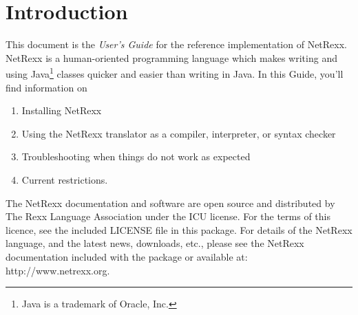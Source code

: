 \chapter{Introduction}
This document is the \emph{User’s Guide} for the reference implementation of
NetRexx. NetRexx is a human-oriented programming language which makes
writing and using Java\footnote{Java is a trademark of Oracle, Inc.} classes quicker and easier than writing in Java. 
In this Guide, you’ll find information on
\begin{enumerate} 
\item Installing NetRexx 
\item Using the NetRexx translator as a compiler, interpreter, or
  syntax checker 
\item Troubleshooting when things do not work as expected
\item Current restrictions.
\end{enumerate} 
The NetRexx documentation and software are open source and distributed by The Rexx Language Association under the ICU license. For the terms of this licence, see the included LICENSE file in this package.
For details of the NetRexx language, and the latest news, downloads, etc., please see the NetRexx documentation included with the package or available at: http://www.netrexx.org.
